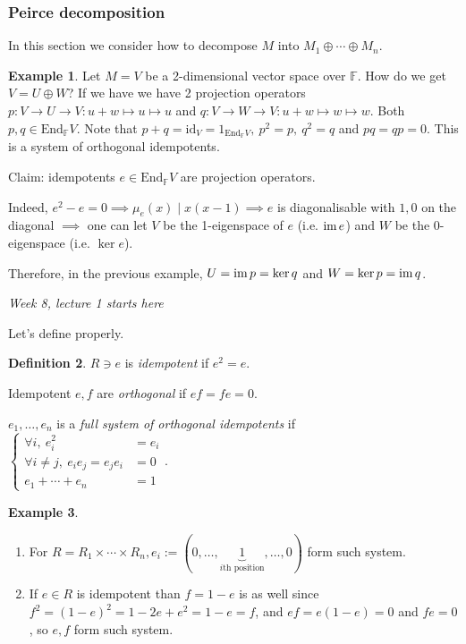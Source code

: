 \documentclass[a4paper]{article}
\newcommand{\F}{\mathbb{F}}
\newcommand{\End}{\text{End}}
\newcommand{\id}{\text{id}}
\newcommand{\im}{\text{im\,}}
\theoremstyle{definition}
\newtheorem{defn}{Definition}[subsection]
\newtheorem{example}[defn]{Example}
\begin{document}
\subsubsection{Peirce decomposition}
In this section we consider how to decompose $M$ into $M_1\oplus\cdots\oplus M_n$.

\begin{example}
Let $M=V$ be a 2-dimensional vector space over $\F$. How do we get $V=U\oplus W$? If we have we have 2 projection operators $p:V\rightarrow U\rightarrow V:u+w\mapsto u\mapsto u$ and $q:V\rightarrow W\rightarrow V:u+w\mapsto w\mapsto w$. Both $p,q\in\End_\F V$. Note that $p+q=\id_V=1_{\End_\F V},\ p^2=p,\ q^2=q$ and $pq=qp=0$. This is a system of orthogonal idempotents.

Claim: idempotents $e\in\End_\F V$ are projection operators.

Indeed, $e^2-e=0\implies \mu_e(x)\mid x(x-1)\implies e$ is diagonalisable with $1,0$ on the diagonal $\implies$ one can let $V$ be the 1-eigenspace of $e$ (i.e. $\im e$) and $W$ be the 0-eigenspace (i.e. $\ker e$).

Therefore, in the previous example, $U=\im p=\ker q$ and $W=\ker p=\im q$.
\end{example}

\begin{flushright}
\textit{Week 8, lecture 1 starts here}
\end{flushright}

Let's define properly.

\begin{defn}
$R\ni e$ is \textit{idempotent} if $e^2=e$.

Idempotent $e,f$ are \textit{orthogonal} if $ef=fe=0$.

$e_1,\ldots,e_n$ is a \textit{full system of orthogonal idempotents} if $\left\{\begin{aligned}
\forall i,\ e_i^2&=e_i \\
\forall i\neq j,\ e_ie_j=e_je_i&=0 \\
e_1+\cdots+e_n&=1
\end{aligned}\right..$
\end{defn}
\begin{example}
\begin{enumerate}
\item For $R=R_1\times\cdots\times R_n, e_i:=(0,\ldots,\underbrace{1}_{i\text{th position}},\ldots,0)$ form such system.
\item If $e\in R$ is idempotent than $f=1-e$ is as well since $f^2=(1-e)^2=1-2e+e^2=1-e=f$, and $ef=e(1-e)=0$ and $fe=0$, so $e,f$ form such system. 
\end{enumerate}
\end{example}
\end{document}

